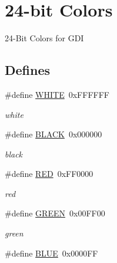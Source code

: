 \hypertarget{group__hgdi__colors24}{
\section{24-bit Colors}
\label{group__hgdi__colors24}
}
24-Bit Colors for GDI  


\subsection*{Defines}
\begin{CompactItemize}
\item 
\hypertarget{group__hgdi__colors24_g87b537f5fa5c109d3c05c13d6b18f382}{
\#define \hyperlink{group__hgdi__colors24_g87b537f5fa5c109d3c05c13d6b18f382}{WHITE}~0xFFFFFF}
\label{group__hgdi__colors24_g87b537f5fa5c109d3c05c13d6b18f382}

\begin{CompactList}\small\item\em white \item\end{CompactList}\item 
\hypertarget{group__hgdi__colors24_g7b3b25cba33b07c303f3060fe41887f6}{
\#define \hyperlink{group__hgdi__colors24_g7b3b25cba33b07c303f3060fe41887f6}{BLACK}~0x000000}
\label{group__hgdi__colors24_g7b3b25cba33b07c303f3060fe41887f6}

\begin{CompactList}\small\item\em black \item\end{CompactList}\item 
\hypertarget{group__hgdi__colors24_g8d23feea868a983c8c2b661e1e16972f}{
\#define \hyperlink{group__hgdi__colors24_g8d23feea868a983c8c2b661e1e16972f}{RED}~0xFF0000}
\label{group__hgdi__colors24_g8d23feea868a983c8c2b661e1e16972f}

\begin{CompactList}\small\item\em red \item\end{CompactList}\item 
\hypertarget{group__hgdi__colors24_gcfbc006ea433ad708fdee3e82996e721}{
\#define \hyperlink{group__hgdi__colors24_gcfbc006ea433ad708fdee3e82996e721}{GREEN}~0x00FF00}
\label{group__hgdi__colors24_gcfbc006ea433ad708fdee3e82996e721}

\begin{CompactList}\small\item\em green \item\end{CompactList}\item 
\hypertarget{group__hgdi__colors24_g79d10e672abb49ad63eeaa8aaef57c38}{
\#define \hyperlink{group__hgdi__colors24_g79d10e672abb49ad63eeaa8aaef57c38}{BLUE}~0x0000FF}
\label{group__hgdi__colors24_g79d10e672abb49ad63eeaa8aaef57c38}


\end{CompactItemize}
